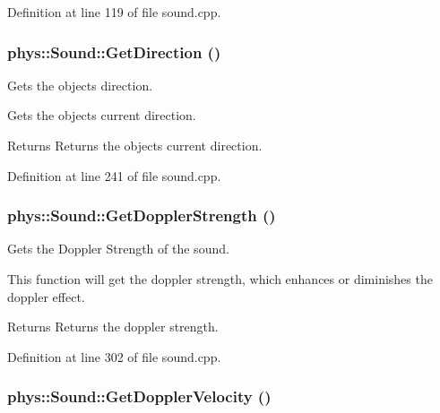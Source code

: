 Definition at line 119 of file sound.cpp.

\hypertarget{classphys_1_1Sound_a228e07cbcf0c8fee7b0f1f86a0162484}{
\subsubsection[{GetDirection}]{ phys::Sound::GetDirection ()}}
\label{dc/d2f/classphys_1_1Sound_a228e07cbcf0c8fee7b0f1f86a0162484}


Gets the objects direction. 

Gets the objects current direction. \begin{DoxyReturn}{Returns}
Returns the objects current direction. 
\end{DoxyReturn}


Definition at line 241 of file sound.cpp.

\hypertarget{classphys_1_1Sound_a894e1390d76c6a6e79404569afeaf168}{
\subsubsection[{GetDopplerStrength}]{ phys::Sound::GetDopplerStrength ()}}
\label{dc/d2f/classphys_1_1Sound_a894e1390d76c6a6e79404569afeaf168}


Gets the Doppler Strength of the sound. 

This function will get the doppler strength, which enhances or diminishes the doppler effect. \begin{DoxyReturn}{Returns}
Returns the doppler strength. 
\end{DoxyReturn}


Definition at line 302 of file sound.cpp.

\hypertarget{classphys_1_1Sound_a9d4e845004b59ba5bdc066f7f12ff7d7}{
\subsubsection[{GetDopplerVelocity}]{ phys::Sound::GetDopplerVelocity ()}}
\label{dc/d2f/classphys_1_1Sound_a9d4e845004b59ba5bdc066f7f12ff7d7}


